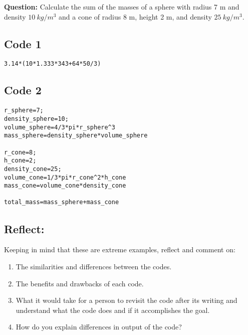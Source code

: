 \documentclass{ximera}
\begin{document}
\textbf{Question:} Calculate the sum of the masses of a sphere with radius 7 m and density $10\ kg/m^3$ and a cone of radius 8 m, height 2 m, and density $25\ kg/m^3$.

\subsection*{Code 1}

\begin{verbatim}
3.14*(10*1.333*343+64*50/3)
\end{verbatim}

\subsection*{Code 2}

\begin{verbatim}
r_sphere=7;
density_sphere=10;
volume_sphere=4/3*pi*r_sphere^3
mass_sphere=density_sphere*volume_sphere

r_cone=8;
h_cone=2;
density_cone=25;
volume_cone=1/3*pi*r_cone^2*h_cone
mass_cone=volume_cone*density_cone

total_mass=mass_sphere+mass_cone
\end{verbatim}

\subsection*{Reflect:}
Keeping in mind that these are extreme examples, reflect and comment on:

\begin{enumerate}
    \item The similarities and differences between the codes.
    \item The benefits and drawbacks of each code.
    \item What it would take for a person to revisit the code after its writing and understand what the code does and if it accomplishes the goal.
    \item How do you explain differences in output of the code?
\end{enumerate}
\end{document}
